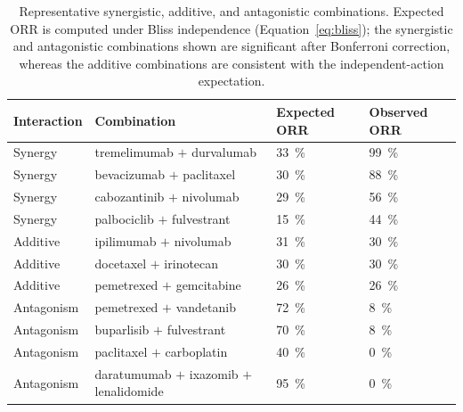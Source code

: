 \documentclass[cancers,article,submit,pdftex,moreauthors]{Definitions/mdpi}
\begin{document}
\begin{table}[H]
\caption{Representative synergistic, additive, and antagonistic combinations.
Expected ORR is computed under Bliss independence (Equation~\eqref{eq:bliss}); the
synergistic and antagonistic combinations shown are significant after Bonferroni
correction, whereas the additive combinations are consistent with the
independent-action expectation.\label{tab:interactions}}
\begin{tabularx}{\textwidth}{lLCC}
\toprule
\textbf{Interaction} & \textbf{Combination} & \textbf{Expected ORR} & \textbf{Observed ORR} \\
\midrule
Synergy & tremelimumab $+$ durvalumab          & \SI{33}{\percent} & \SI{99}{\percent} \\
Synergy & bevacizumab $+$ paclitaxel           & \SI{30}{\percent} & \SI{88}{\percent} \\
Synergy & cabozantinib $+$ nivolumab           & \SI{29}{\percent} & \SI{56}{\percent} \\
Synergy & palbociclib $+$ fulvestrant          & \SI{15}{\percent} & \SI{44}{\percent} \\
\midrule
Additive & ipilimumab $+$ nivolumab            & \SI{31}{\percent} & \SI{30}{\percent} \\
Additive & docetaxel $+$ irinotecan            & \SI{30}{\percent} & \SI{30}{\percent} \\
Additive & pemetrexed $+$ gemcitabine          & \SI{26}{\percent} & \SI{26}{\percent} \\
\midrule
Antagonism & pemetrexed $+$ vandetanib         & \SI{72}{\percent} & \SI{8}{\percent} \\
Antagonism & buparlisib $+$ fulvestrant        & \SI{70}{\percent} & \SI{8}{\percent} \\
Antagonism & paclitaxel $+$ carboplatin        & \SI{40}{\percent} & \SI{0}{\percent} \\
Antagonism & daratumumab $+$ ixazomib $+$ lenalidomide & \SI{95}{\percent} & \SI{0}{\percent} \\
\bottomrule
\end{tabularx}
\end{table}
\end{document}
